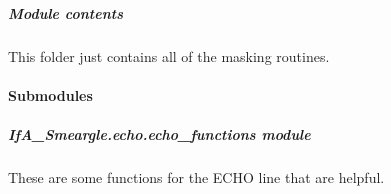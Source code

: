\documentclass[letterpaper,10pt,english]{sphinxmanual}
\begin{document}
\subparagraph{Module contents}
\label{\detokenize{python_docstrings/IfA_Smeargle.echo.masks:module-IfA_Smeargle.echo.masks}}\label{\detokenize{python_docstrings/IfA_Smeargle.echo.masks:module-contents}}
This folder just contains all of the masking routines.


\paragraph{Submodules}
\label{\detokenize{python_docstrings/IfA_Smeargle.echo:submodules}}

\subparagraph{IfA\_Smeargle.echo.echo\_functions module}
\label{\detokenize{python_docstrings/IfA_Smeargle.echo.echo_functions:module-IfA_Smeargle.echo.echo_functions}}\label{\detokenize{python_docstrings/IfA_Smeargle.echo.echo_functions:ifa-smeargle-echo-echo-functions-module}}\label{\detokenize{python_docstrings/IfA_Smeargle.echo.echo_functions::doc}}
These are some functions for the ECHO line that are helpful.
\end{document}

